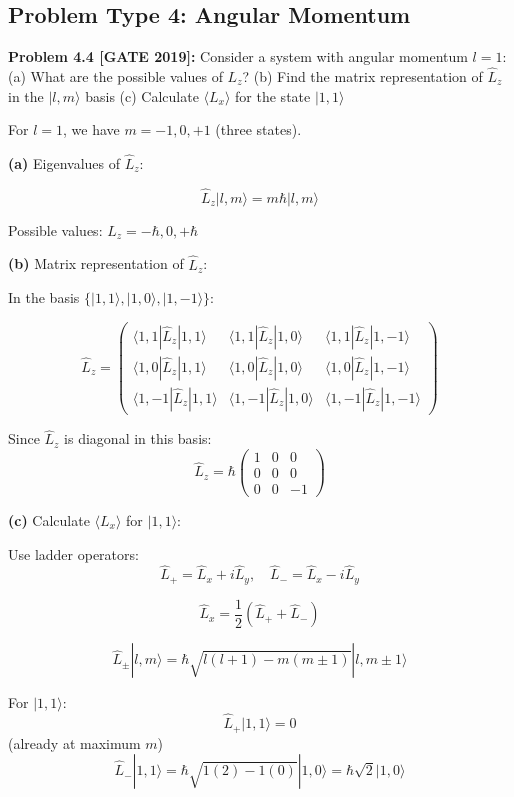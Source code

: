 \documentclass[12pt,a4paper]{article}
\begin{document}
\subsection{Problem Type 4: Angular Momentum}

\textbf{Problem 4.4 [GATE 2019]:} Consider a system with angular momentum $l = 1$:
(a) What are the possible values of $L_z$?
(b) Find the matrix representation of $\hat{L}_z$ in the $|l, m\rangle$ basis
(c) Calculate $\langle L_x \rangle$ for the state $|1, 1\rangle$

\begin{solution}
For $l = 1$, we have $m = -1, 0, +1$ (three states).

\textbf{(a)} Eigenvalues of $\hat{L}_z$:

$$\hat{L}_z|l,m\rangle = m\hbar|l,m\rangle$$

Possible values: $L_z = -\hbar, 0, +\hbar$

\textbf{(b)} Matrix representation of $\hat{L}_z$:

In the basis $\{|1,1\rangle, |1,0\rangle, |1,-1\rangle\}$:

$$\hat{L}_z = \begin{pmatrix}
\langle 1,1|\hat{L}_z|1,1\rangle & \langle 1,1|\hat{L}_z|1,0\rangle & \langle 1,1|\hat{L}_z|1,-1\rangle \\
\langle 1,0|\hat{L}_z|1,1\rangle & \langle 1,0|\hat{L}_z|1,0\rangle & \langle 1,0|\hat{L}_z|1,-1\rangle \\
\langle 1,-1|\hat{L}_z|1,1\rangle & \langle 1,-1|\hat{L}_z|1,0\rangle & \langle 1,-1|\hat{L}_z|1,-1\rangle
\end{pmatrix}$$

Since $\hat{L}_z$ is diagonal in this basis:
$$\hat{L}_z = \hbar\begin{pmatrix}
1 & 0 & 0 \\
0 & 0 & 0 \\
0 & 0 & -1
\end{pmatrix}$$

\textbf{(c)} Calculate $\langle L_x \rangle$ for $|1,1\rangle$:

Use ladder operators:
$$\hat{L}_+ = \hat{L}_x + i\hat{L}_y, \quad \hat{L}_- = \hat{L}_x - i\hat{L}_y$$

$$\hat{L}_x = \frac{1}{2}(\hat{L}_+ + \hat{L}_-)$$

$$\hat{L}_\pm|l,m\rangle = \hbar\sqrt{l(l+1) - m(m\pm 1)}|l, m\pm 1\rangle$$

For $|1,1\rangle$:
$$\hat{L}_+|1,1\rangle = 0$$ (already at maximum $m$)
$$\hat{L}_-|1,1\rangle = \hbar\sqrt{1(2) - 1(0)}|1,0\rangle = \hbar\sqrt{2}|1,0\rangle$$


\end{solution}
\end{document}
